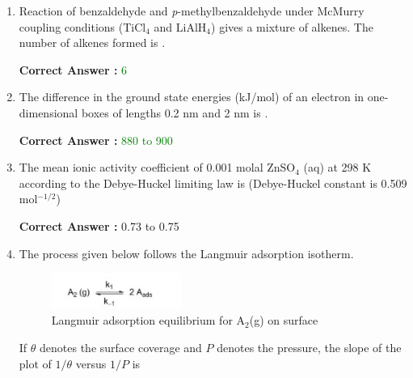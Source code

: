 \documentclass[journal,12pt,onecolumn]{exam}
\theoremstyle{remark}
\begin{document}
\begin{enumerate}
\item 
Reaction of benzaldehyde and \emph{p}-methylbenzaldehyde under McMurry coupling conditions (TiCl$_4$ and LiAlH$_4$) gives a mixture of alkenes. The number of alkenes formed is \underline{\hspace{3cm}}.

\hfill{}


\textbf{Correct Answer :} \textcolor{green}{6}


\item 
The difference in the ground state energies (kJ/mol) of an electron in one-dimensional boxes of lengths 0.2 nm and 2 nm is \underline{\hspace{3cm}}.

\hfill{}


\textbf{Correct Answer :} \textcolor{green}{880 to 900}







\item 
The mean ionic activity coefficient of 0.001 molal ZnSO$_4$ (aq) at 298 K according to the Debye-Huckel limiting law is (Debye-Huckel constant is 0.509 mol$^{-1/2}$) \underline{\hspace{3cm}}

\hfill{}


\textbf{Correct Answer :} \textcolor{green!60!black}{0.73 to 0.75}


\item 
The process given below follows the Langmuir adsorption isotherm.

\begin{figure}[H]
    \centering
    \includegraphics[width=0.4\textwidth]{figs/image10.png} %
    \caption{Langmuir adsorption equilibrium for A$_2$(g) on surface}
    \label{fig:langmuir_adsorption}
\end{figure}

If $\theta$ denotes the surface coverage and $P$ denotes the pressure, the slope of the plot of $1/\theta$ versus $1/P$ is


\end{enumerate}
\end{document}
